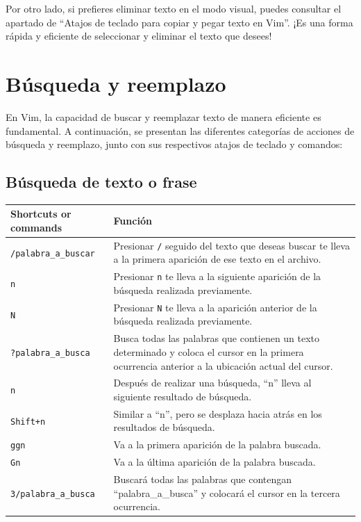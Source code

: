 \documentclass[
  doc,
  floatsintext,
  longtable,
  a4paper,
  nolmodern,
  notxfonts,
  notimes,
  12pt,
  colorlinks=true,linkcolor=blue,citecolor=blue,urlcolor=blue]{apa7}
\newcounter{none} %
\begin{document}
Por otro lado, si prefieres eliminar texto en el modo visual, puedes
consultar el apartado de ``Atajos de teclado para copiar y pegar texto
en Vim''. ¡Es una forma rápida y eficiente de seleccionar y eliminar el
texto que desees!

\section{Búsqueda y reemplazo}\label{buxfasqueda-y-reemplazo}

En Vim, la capacidad de buscar y reemplazar texto de manera eficiente es
fundamental. A continuación, se presentan las diferentes categorías de
acciones de búsqueda y reemplazo, junto con sus respectivos atajos de
teclado y comandos:

\subsection{Búsqueda de texto o
frase}\label{buxfasqueda-de-texto-o-frase}

{\def\LTcaptype{none} %
\begin{longtable}[]{@{}
  >{\raggedright\arraybackslash}p{}
  >{\raggedright\arraybackslash}p{}@{}}
\toprule\noalign{}
\begin{minipage}[b]{\linewidth}\raggedright
Shortcuts or commands
\end{minipage} & \begin{minipage}[b]{\linewidth}\raggedright
Función
\end{minipage} \\
\midrule\noalign{}
\endhead
\bottomrule\noalign{}
\endlastfoot
\texttt{/palabra\_a\_buscar} & Presionar \texttt{/} seguido del texto
que deseas buscar te lleva a la primera aparición de ese texto en el
archivo. \\
\texttt{n} & Presionar \texttt{n} te lleva a la siguiente aparición de
la búsqueda realizada previamente. \\
\texttt{N} & Presionar \texttt{N} te lleva a la aparición anterior de la
búsqueda realizada previamente. \\
\texttt{?palabra\_a\_busca} & Busca todas las palabras que contienen un
texto determinado y coloca el cursor en la primera ocurrencia anterior a
la ubicación actual del cursor. \\
\texttt{n} & Después de realizar una búsqueda, ``n'' lleva al siguiente
resultado de búsqueda. \\
\texttt{Shift+n} & Similar a ``n'', pero se desplaza hacia atrás en los
resultados de búsqueda. \\
\texttt{ggn} & Va a la primera aparición de la palabra buscada. \\
\texttt{Gn} & Va a la última aparición de la palabra buscada. \\
\texttt{3/palabra\_a\_busca} & Buscará todas las palabras que contengan
``palabra\_a\_busca'' y colocará el cursor en la tercera ocurrencia. \\
\end{longtable}
}
\end{document}
